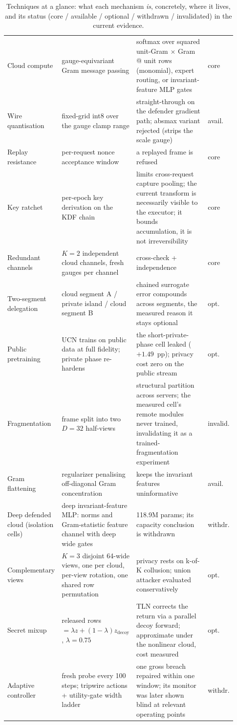 \documentclass[11pt]{article}
\newcommand{\pp}{pp}
\begin{document}
\begin{table}[H]
\begin{tabular}{@{}p{0.12\linewidth}p{0.24\linewidth}p{0.48\linewidth}p{0.09\linewidth}@{}}
Cloud compute & gauge-equivariant Gram message passing & softmax over squared unit-Gram $\times$ Gram @ unit rows (monomial), expert routing, or invariant-feature MLP gates & core \\
Wire quantisation & fixed-grid int8 over the gauge clamp range & straight-through on the defender gradient path; absmax variant rejected (strips the scale gauge) & avail. \\
Replay resistance & per-request nonce acceptance window & a replayed frame is refused & core \\
Key ratchet & per-epoch key derivation on the KDF chain & limits cross-request capture pooling; the current transform is necessarily visible to the executor; it bounds accumulation, it is not irreversibility & core \\
Redundant channels & $K{=}2$ independent cloud channels, fresh gauges per channel & cross-check + independence & core \\
Two-segment delegation & cloud segment A / private island / cloud segment B & chained surrogate error compounds across segments, the measured reason it stays optional & opt. \\
Public pretraining & UCN trains on public data at full fidelity; private phase re-hardens & the short-private-phase cell leaked ($+1.49$~\pp{}); privacy cost zero on the public stream & opt. \\
Fragmentation & frame split into two $D{=}32$ half-views & structural partition across servers; the measured cell's remote modules never trained, invalidating it as a trained-fragmentation experiment & invalid. \\
Gram flattening & regularizer penalising off-diagonal Gram concentration & keeps the invariant features uninformative & avail. \\
Deep defended cloud (isolation cells) & deep invariant-feature MLP: norms and Gram-statistic feature channel with deep wide gates & 118.9M params; its capacity conclusion is withdrawn & withdr. \\
Complementary views & $K{=}3$ disjoint 64-wide views, one per cloud, per-view rotation, one shared row permutation & privacy rests on k-of-K collusion; union attacker evaluated conservatively & opt. \\
Secret mixup & released rows $= \lambda z + (1{-}\lambda) z_{\text{decoy}}$, $\lambda{=}0.75$ & TLN corrects the return via a parallel decoy forward; approximate under the nonlinear cloud, cost measured & opt. \\
Adaptive controller & fresh probe every 100 steps; tripwire actions + utility-gate width ladder & one gross breach repaired within one window; its monitor was later shown blind at relevant operating points & withdr. \\
\bottomrule
\end{tabular}
\caption{Techniques at a glance: what each mechanism \emph{is}, concretely,
where it lives, and its status (core / available / optional / withdrawn /
invalidated) in the current evidence.}
\label{tab:stack}
\end{table}
\end{document}
